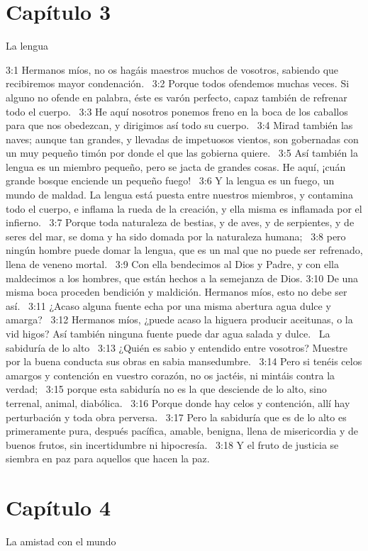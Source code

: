 \section*{Capítulo 3 }
La lengua  

3:1 Hermanos míos, no os hagáis maestros muchos de vosotros, sabiendo que recibiremos mayor condenación.  
3:2 Porque todos ofendemos muchas veces. Si alguno no ofende en palabra, éste es varón perfecto, capaz también de refrenar todo el cuerpo.  
3:3 He aquí nosotros ponemos freno en la boca de los caballos para que nos obedezcan, y dirigimos así todo su cuerpo.  
3:4 Mirad también las naves; aunque tan grandes, y llevadas de impetuosos vientos, son gobernadas con un muy pequeño timón por donde el que las gobierna quiere.  
3:5 Así también la lengua es un miembro pequeño, pero se jacta de grandes cosas. He aquí, ¡cuán grande bosque enciende un pequeño fuego!  
3:6 Y la lengua es un fuego, un mundo de maldad. La lengua está puesta entre nuestros miembros, y contamina todo el cuerpo, e inflama la rueda de la creación, y ella misma es inflamada por el infierno.  
3:7 Porque toda naturaleza de bestias, y de aves, y de serpientes, y de seres del mar, se doma y ha sido domada por la naturaleza humana;  
3:8 pero ningún hombre puede domar la lengua, que es un mal que no puede ser refrenado, llena de veneno mortal.  
3:9 Con ella bendecimos al Dios y Padre, y con ella maldecimos a los hombres, que están hechos a la semejanza de Dios. 
3:10 De una misma boca proceden bendición y maldición. Hermanos míos, esto no debe ser así.  
3:11 ¿Acaso alguna fuente echa por una misma abertura agua dulce y amarga?  
3:12 Hermanos míos, ¿puede acaso la higuera producir aceitunas, o la vid higos? Así también ninguna fuente puede dar agua salada y dulce.  
La sabiduría de lo alto  
3:13 ¿Quién es sabio y entendido entre vosotros? Muestre por la buena conducta sus obras en sabia mansedumbre.  
3:14 Pero si tenéis celos amargos y contención en vuestro corazón, no os jactéis, ni mintáis contra la verdad;  
3:15 porque esta sabiduría no es la que desciende de lo alto, sino terrenal, animal, diabólica.  
3:16 Porque donde hay celos y contención, allí hay perturbación y toda obra perversa.  
3:17 Pero la sabiduría que es de lo alto es primeramente pura, después pacífica, amable, benigna, llena de misericordia y de buenos frutos, sin incertidumbre ni hipocresía.  
3:18 Y el fruto de justicia se siembra en paz para aquellos que hacen la paz.  
\section*{Capítulo 4}
La amistad con el mundo  

